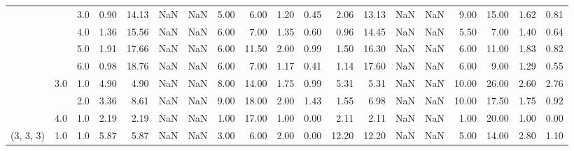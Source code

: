 \begin{tabular}{lllrrrrrrrrrrrrrrrr}
          &     & 3.0  &      0.90 &      14.13 &               NaN &                NaN &  5.00 &   6.00 &             1.20 &                         0.45 &      2.06 &      13.13 &               NaN &                NaN &  9.00 &  15.00 &             1.62 &                         0.81 \\
          &     & 4.0  &      1.36 &      15.56 &               NaN &                NaN &  6.00 &   7.00 &             1.35 &                         0.60 &      0.96 &      14.45 &               NaN &                NaN &  5.50 &   7.00 &             1.40 &                         0.64 \\
          &     & 5.0  &      1.91 &      17.66 &               NaN &                NaN &  6.00 &  11.50 &             2.00 &                         0.99 &      1.50 &      16.30 &               NaN &                NaN &  6.00 &  11.00 &             1.83 &                         0.82 \\
          &     & 6.0  &      0.98 &      18.76 &               NaN &                NaN &  6.00 &   7.00 &             1.17 &                         0.41 &      1.14 &      17.60 &               NaN &                NaN &  6.00 &   9.00 &             1.29 &                         0.55 \\
          & 3.0 & 1.0  &      4.90 &       4.90 &               NaN &                NaN &  8.00 &  14.00 &             1.75 &                         0.99 &      5.31 &       5.31 &               NaN &                NaN & 10.00 &  26.00 &             2.60 &                         2.76 \\
          &     & 2.0  &      3.36 &       8.61 &               NaN &                NaN &  9.00 &  18.00 &             2.00 &                         1.43 &      1.55 &       6.98 &               NaN &                NaN & 10.00 &  17.50 &             1.75 &                         0.92 \\
          & 4.0 & 1.0  &      2.19 &       2.19 &               NaN &                NaN &  1.00 &  17.00 &             1.00 &                         0.00 &      2.11 &       2.11 &               NaN &                NaN &  1.00 &  20.00 &             1.00 &                         0.00 \\
(3, 3, 3) & 1.0 & 1.0  &      5.87 &       5.87 &               NaN &                NaN &  3.00 &   6.00 &             2.00 &                         0.00 &     12.20 &      12.20 &               NaN &                NaN &  5.00 &  14.00 &             2.80 &                         1.10 \\

\end{tabular}
